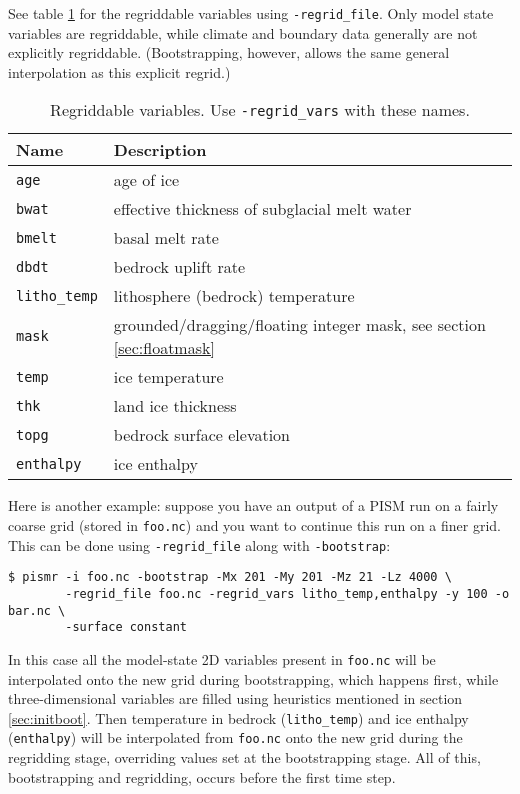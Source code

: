 See table \ref{tab:regridvar} for the regriddable variables using
\texttt{-regrid_file}.  Only model state variables are regriddable, while climate and boundary data generally are not explicitly regriddable.  (Bootstrapping, however, allows the same general interpolation as this explicit regrid.)

\begin{table}[ht]
  \centering
  \begin{tabular}{ll}\toprule
    \textbf{Name} & \textbf{Description}\\ \midrule
    \texttt{age} & age of ice\\
    \texttt{bwat} & effective thickness of subglacial melt water \\
    \texttt{bmelt} & basal melt rate \\
    \texttt{dbdt} & bedrock uplift rate \\
    \texttt{litho_temp} & lithosphere (bedrock) temperature \\
    \texttt{mask} & grounded/dragging/floating integer mask, see section \ref{sec:floatmask} \\
    \texttt{temp} & ice temperature \\
    \texttt{thk} & land ice thickness \\
    \texttt{topg} & bedrock surface elevation \\
    \texttt{enthalpy} & ice enthalpy\\
    \bottomrule
  \end{tabular}
\caption{Regriddable variables.  Use \texttt{-regrid_vars} with these names.}
\label{tab:regridvar}
\end{table}

Here is another example: suppose you have an output of a PISM run on a fairly
coarse grid (stored in \texttt{foo.nc}) and you want to continue this run on a
finer grid. This can be done using \texttt{-regrid_file} along with
\texttt{-bootstrap}:
\begin{verbatim}
$ pismr -i foo.nc -bootstrap -Mx 201 -My 201 -Mz 21 -Lz 4000 \
        -regrid_file foo.nc -regrid_vars litho_temp,enthalpy -y 100 -o bar.nc \
        -surface constant
\end{verbatim}
In this case all the model-state 2D variables present in \texttt{foo.nc} will
be interpolated onto the new grid during bootstrapping, which happens first,
while three-dimensional variables are filled using heuristics mentioned in
section \ref{sec:initboot}.  Then temperature in bedrock (\texttt{litho_temp}) and
ice enthalpy (\texttt{enthalpy}) will be interpolated from \texttt{foo.nc} onto the
new grid during the regridding stage, overriding values set at the
bootstrapping stage.  All of this, bootstrapping and regridding, occurs before
the first time step.



